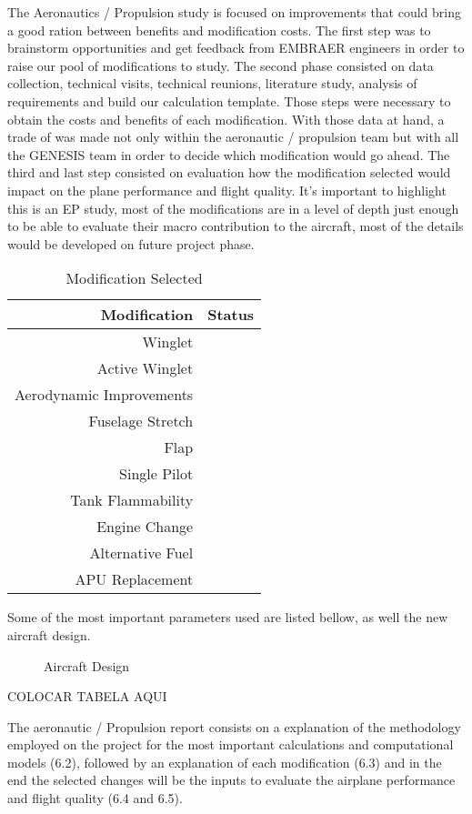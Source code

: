 The Aeronautics / Propulsion study is focused on improvements that could bring a good ration between benefits and modification costs. The first step was to brainstorm opportunities and get feedback from EMBRAER engineers in order to raise our pool of modifications to study.
The second phase consisted on data collection, technical visits, technical reunions, literature study, analysis of requirements and build our calculation template. Those steps were necessary to obtain the costs and benefits of each modification. With those data at hand, a trade of was made not only within the aeronautic / propulsion team but with all the GENESIS team in order to decide which modification would go ahead.
The third and last step consisted on evaluation how the modification selected would impact on the plane performance and flight quality.
It's important to highlight this is an EP study, most of the modifications are in a level of depth just enough to be able to evaluate their macro contribution to the aircraft, most of the details would be developed on future project phase.

\begin{table}[htbp]
  \centering
  \caption{Modification Selected}
    \begin{tabular}{rr}
    \toprule
    Modification & Status \\
    \midrule
    Winglet &  \\
    Active Winglet &  \\
    Aerodynamic Improvements &  \\
    Fuselage Stretch &  \\
    Flap  &  \\
    Single Pilot &  \\
    Tank Flammability &  \\
    Engine Change &  \\
    Alternative Fuel &  \\
    APU Replacement &  \\
    \bottomrule
    \end{tabular}%
  \label{tab:Modification Selected}%
\end{table}%

Some of the most important parameters used are listed bellow, as well the new aircraft design.


\begin{figure}[H] %
\caption{Aircraft Design}
\label{fig:aircraftdesign}
\end{figure}


COLOCAR TABELA AQUI


The aeronautic / Propulsion report consists on a explanation of the methodology employed on the project for the most important calculations and computational models (6.2), followed by an explanation of each modification (6.3) and in the end the selected changes will be the inputs to evaluate the airplane performance and flight quality (6.4 and 6.5).
